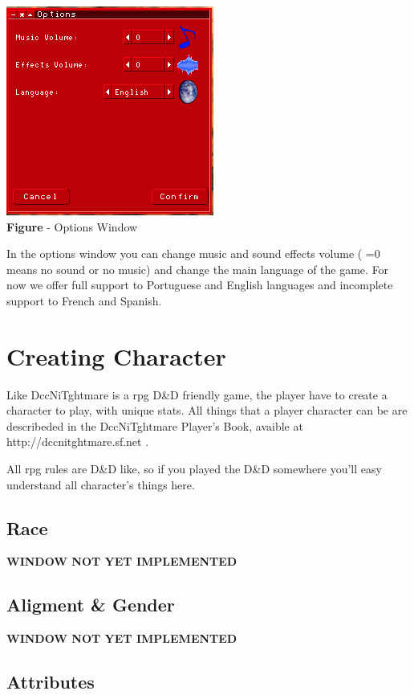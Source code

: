 \documentclass[ letterpaper,12pt]{article}
\begin{document}
\begin{center}
  \includegraphics{optionsWindow.png}
\\{\bf Figure} - Options Window
\end{center}

In the options window you can change music and sound effects volume ( =0 means no sound or no music) and change the main language of the game. For now we offer full support to Portuguese and English languages and incomplete support to French and Spanish.

\section{Creating Character}

Like DccNiTghtmare is a rpg D\&D friendly game, the player have to create a character to play, with unique stats. All things that a player character can be are describeded in the DccNiTghtmare Player's Book, avaible at http://dccnitghtmare.sf.net .

All rpg rules are D\&D like, so if you played the D\&D somewhere you'll easy understand all character's things here.

\subsection{Race}

{\bf WINDOW NOT YET IMPLEMENTED}

\subsection{Aligment \& Gender}

{\bf WINDOW NOT YET IMPLEMENTED}

\subsection{Attributes}
\end{document}
